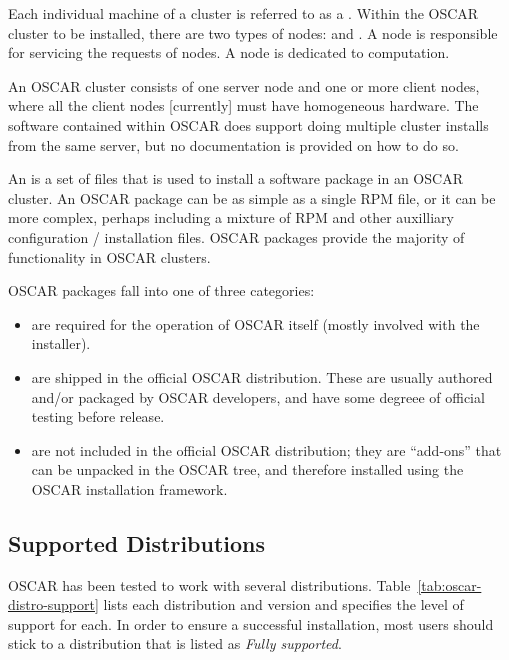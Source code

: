 Each individual machine of a cluster is referred to as a .
Within the OSCAR cluster to be installed, there are two types of
nodes:  and . A  node is
responsible for servicing the requests of  nodes.  A
 node is dedicated to computation.  

An OSCAR cluster consists of one server node and one or more client
nodes, where all the client nodes [currently] must have homogeneous
hardware.  The software contained within OSCAR does support doing
multiple cluster installs from the same server, but no documentation
is provided on how to do so.

An  is a set of files that is used to install a
software package in an OSCAR cluster.  An OSCAR package can be as
simple as a single RPM file, or it can be more complex, perhaps
including a mixture of RPM and other auxilliary configuration /
installation files.  OSCAR packages provide the majority of
functionality in OSCAR clusters.  

OSCAR packages fall into one of three categories:

\begin{itemize}
\item {} are required for the operation of OSCAR
  itself (mostly involved with the installer).
  
\item {} are shipped in the official OSCAR
  distribution.  These are usually authored and/or packaged by OSCAR
  developers, and have some degreee of official testing before
  release.
  
\item {} are not included in the official
  OSCAR distribution; they are ``add-ons'' that can be unpacked in the
  OSCAR tree, and therefore installed using the OSCAR installation
  framework.  
\end{itemize}


\subsection{Supported Distributions}

OSCAR has been tested to work with several distributions.
Table~\ref{tab:oscar-distro-support} lists each distribution and
version and specifies the level of support for each. In order to
ensure a successful installation, most users should stick to a
distribution that is listed as \emph{Fully supported}.

